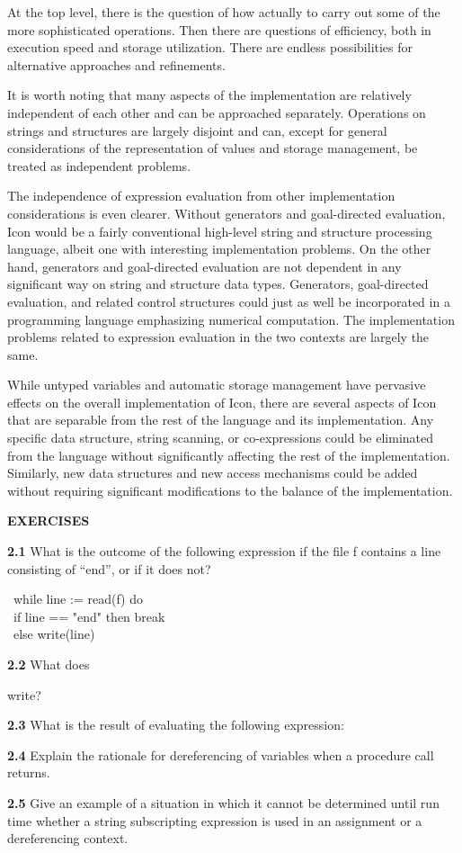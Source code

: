 At the top level, there is the question of how actually to carry out
some of the more sophisticated operations. Then there are questions of
efficiency, both in execution speed and storage utilization. There are
endless possibilities for alternative approaches and refinements.

It is worth noting that many aspects of the implementation are
relatively independent of each other and can be approached
separately. Operations on strings and structures are largely disjoint
and can, except for general considerations of the representation of
values and storage management, be treated as independent problems.

The independence of expression evaluation from other implementation
considerations is even clearer. Without generators and goal-directed
evaluation, Icon would be a fairly conventional high-level string and
structure processing language, albeit one with interesting
implementation problems. On the other hand, generators and
goal-directed evaluation are not dependent in any significant way on
string and structure data types. Generators, goal-directed evaluation,
and related control structures could just as well be incorporated in a
programming language emphasizing numerical computation. The
implementation problems related to expression evaluation in the two
contexts are largely the same.

While untyped variables and automatic storage management have
pervasive effects on the overall implementation of Icon, there are
several aspects of Icon that are separable from the rest of the
language and its implementation. Any specific data structure, string
scanning, or co-expressions could be eliminated from the language
without significantly affecting the rest of the
implementation. Similarly, new data structures and new access
mechanisms could be added without requiring significant modifications
to the balance of the implementation.

\bigskip

\noindent \textbf{EXERCISES}

\noindent \textbf{2.1} What is the outcome of the following expression if the
file f contains a line consisting of ``end'', or if it does not?

\begin{iconcode}
\>\ while line := read(f) do\\
\>\>\>\ if line == "end" then break\\
\>\>\>\ else write(line)
\end{iconcode}

\noindent \textbf{2.2} What does


\noindent write?

\noindent
\textbf{2.3} What is the result of evaluating the following expression:


\noindent \textbf{2.4} Explain the rationale for dereferencing of
variables when a procedure call returns.

\noindent \textbf{2.5} Give an example of a situation in which it
cannot be determined until run time whether a string subscripting
expression is used in an assignment or a dereferencing context.
